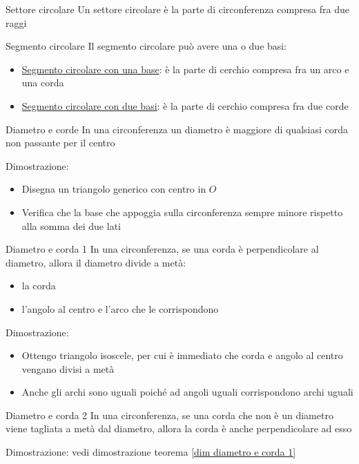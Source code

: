 \begin{definizione}{Settore circolare}
	Un settore circolare è la parte di circonferenza compresa fra due raggi
\end{definizione}

\begin{definizione}{Segmento circolare}
	Il segmento circolare può avere una o due basi:
	\begin{itemize}
		\item \underline{Segmento circolare con una base}: è la parte di cerchio compresa fra un arco e una corda
		\item \underline{Segmento circolare con due basi}: è la parte di cerchio compresa fra due corde
	\end{itemize}
\end{definizione}

\begin{teorema}{Diametro e corde}
	In una circonferenza un diametro è maggiore di qualsiasi corda non passante per il centro
\end{teorema}
Dimostrazione:
\begin{itemize}
	\item Disegna un triangolo generico con centro in $ O $
	\item Verifica che la base che appoggia sulla circonferenza sempre minore rispetto alla somma dei due lati
\end{itemize}

\begin{teorema}{Diametro e corda 1}
	In una circonferenza, se una corda è perpendicolare al diametro, allora il diametro divide a metà:
	\begin{itemize}
		\item la corda
		\item l'angolo al centro e l'arco che le corrispondono
	\end{itemize}
\end{teorema}
Dimostrazione: \label{dim diametro e corda 1}
\begin{itemize}
	\item Ottengo triangolo isoscele, per cui è immediato che corda e angolo al centro vengano divisi a metà
	\item Anche gli archi sono uguali poiché ad angoli uguali corrispondono archi uguali
\end{itemize}
\begin{teorema}{Diametro e corda 2}
	In una circonferenza, se una corda che non è un diametro viene tagliata a metà dal diametro, allora la corda è anche perpendicolare ad esso
\end{teorema}
Dimostrazione: vedi dimostrazione teorema \ref{dim diametro e corda 1}
